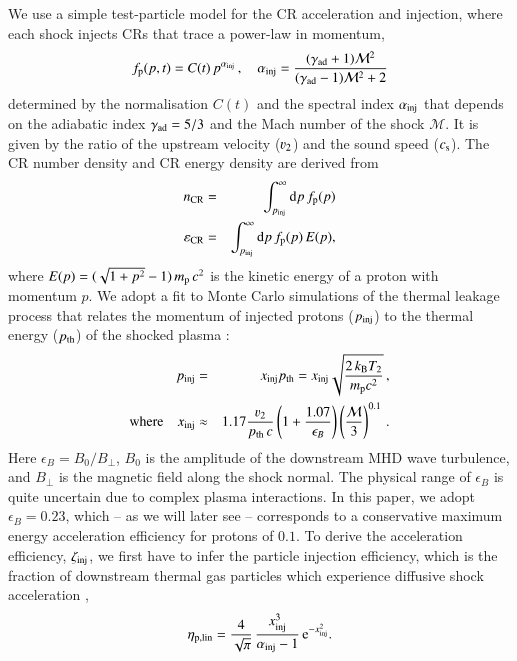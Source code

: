 \documentclass[fleqn,usenatbib,useAMS]{mnras}
\newcommand{\dd}{\mathrm{d}}
\newcommand{\eb}{\epsilon_B}
\newcommand{\p}{\rmn{p}}
\newcommand{\kB}{k_{\rmn{B}}}
\newcommand{\eps}{\varepsilon}
\newcommand{\CR}{\rmn{CR}}
\begin{document}
We use a simple test-particle model for the CR acceleration and
injection, where each shock injects CRs that trace a power-law in
momentum,
\begin{equation}
  f_\p(p,t) = C(t)\,p^{\alpha_\rmn{inj}}\,,\quad
  \alpha_\rmn{inj}=\frac{(\gamma_\rmn{ad}+1)\mathcal{M}^2}
        {(\gamma_\rmn{ad}-1)\mathcal{M}^2+2}
\end{equation}
determined by the normalisation $C(t)$ and the spectral index
$\alpha_{{\mathrm{inj}}}$ that depends on the adiabatic index
$\gamma_{\mathrm{ad}} = 5/3$ and the Mach number of the shock
$\mathcal{M}$. It is given by the ratio of the upstream velocity
($\varv_2$) and the sound speed ($c_{\rm s}$). The CR number density and CR
energy density are derived from
\begin{eqnarray}
n_\CR &=&
\int_{p_\rmn{inj}}^\infty \dd p\, f_\p(p)\\
\eps_\CR &=&
\int_{p_\rmn{inj}}^\infty \dd p\, f_\p(p) \,E(p),
\end{eqnarray}
where $E(p) = (\sqrt{1+p^2} -1)\, m_{{\mathrm{p}}}\,c^2$ is the kinetic energy of a
proton with momentum $p$. We adopt a fit to Monte Carlo simulations of the
thermal leakage process that relates the momentum of injected protons
($p_{\mathrm{inj}}$) to the thermal energy ($p_{\mathrm{th}}$) of the shocked plasma
\citep{kang11}:
\begin{eqnarray}
  \label{eq:qinj}
  p_\rmn{inj} &=& x_\rmn{inj} p_\rmn{th} =
  x_\rmn{inj} \sqrt{\frac{2 \,\kB T_2}{m_{\rmn{p}} c^2}}\,, \nonumber \\
  \rmn{where}\quad x_\rmn{inj} &\approx& 1.17 \frac{\varv_2}{p_{\rmn{th}}\,c} \left(1+
  \frac{1.07}{\eb}\right) \left(\frac{\mathcal{M}}{3}\right)^{0.1}\,.
\end{eqnarray}
Here $\eb = B_0/B_{\perp}$, $B_0$ is the amplitude of the downstream
MHD wave turbulence, and $B_{\perp}$ is the magnetic field along the
shock normal. The physical range of $\eb$ is quite uncertain due to
complex plasma interactions. In this paper, we adopt $\eb = 0.23$,
which -- as we will later see -- corresponds to a conservative maximum
energy acceleration efficiency for protons of $0.1$. To derive the
acceleration efficiency, $\zeta_{\mathrm{inj}}$, we first have to infer the
particle injection efficiency, which is the fraction of downstream
thermal gas particles which experience diffusive shock acceleration
\citep[for details see][]{pinzke13},
\begin{equation}
  \label{eq:eta}
  \eta_{\mathrm{p,lin}} =
  \frac{4}{\sqrt{\pi}}\,\frac{x_{\mathrm{inj}}^3}{\alpha_{\mathrm{inj}}-1}\,
  {\mathrm{e}}^{-x_{\mathrm{inj}}^2}.
\end{equation}
\end{document}
